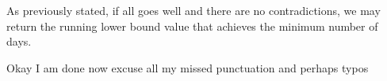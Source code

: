 \documentclass[12pt]{article}
\begin{document}
\begin{problemnum}
    As previously stated, if all goes well and there are no contradictions, we
    may return the running lower bound value that achieves the minimum number
    of days.

    
\end{problemnum}

Okay I am done now excuse all my missed punctuation and perhaps typos
\end{document}
